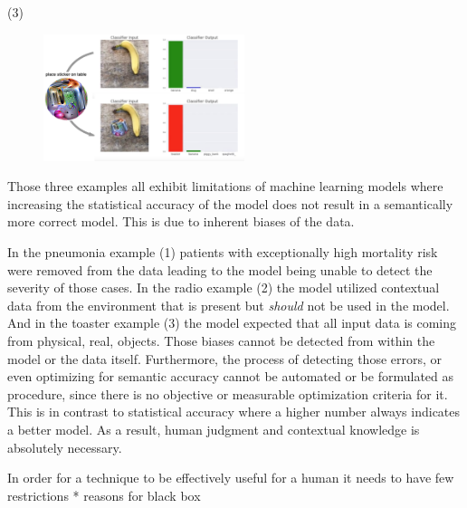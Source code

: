 \par \noindent (3)

\begin{figure}
\centering
\includegraphics[height=10em]{tex/introduction/adversarialtoaster.png}
\caption{
}
\label{figs:toaster}
\end{figure}

Those three examples all exhibit limitations of machine learning models where increasing the statistical accuracy of the model does not result in a semantically more correct model.
This is due to inherent biases of the data.

In the pneumonia example (1) patients with exceptionally high mortality risk were removed from the data leading to the model being unable to detect the severity of those cases.
In the radio example (2) the model utilized contextual data from the environment that is present but \emph{should} not be used in the model.
And in the toaster example (3) the model expected that all input data is coming from physical, real, objects.
Those biases cannot be detected from within the model or the data itself.
Furthermore, the process of detecting those errors, or even optimizing for semantic accuracy cannot be automated or be formulated as procedure, since there is no objective or measurable optimization criteria for it.
This is in contrast to statistical accuracy where a higher number always indicates a better model.
As a result, human judgment and contextual knowledge is absolutely necessary.

In order for a technique to be effectively useful for a human it needs to have few restrictions \todo{}
* reasons for black box
